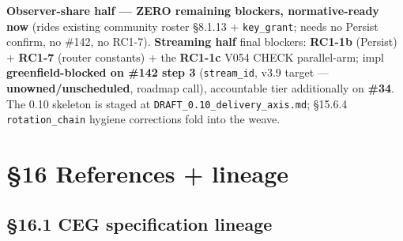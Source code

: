 \documentclass[10pt]{article}
\begin{document}
\textbf{Observer-share half — ZERO remaining blockers, normative-ready now} (rides existing community roster §8.1.13 + \texttt{key\_grant}; needs no Persist confirm, no \#142, no RC1-7). \textbf{Streaming half} final blockers: \textbf{RC1-1b} (Persist) + \textbf{RC1-7} (router constants) + the \textbf{RC1-1c} V054 CHECK parallel-arm; impl \textbf{greenfield-blocked on \#142 step 3} (\texttt{stream\_id}, v3.9 target — \textbf{unowned/unscheduled}, roadmap call), accountable tier additionally on \textbf{\#34}. The 0.10 skeleton is staged at \texttt{DRAFT\_0.10\_delivery\_axis.md}; §15.6.4 \texttt{rotation\_chain} hygiene corrections fold into the weave.




\clearpage


\section*{§16 References + lineage}


\subsection*{§16.1 CEG specification lineage}
\end{document}

